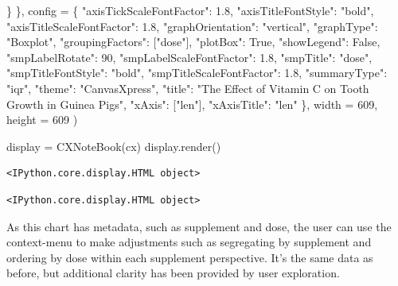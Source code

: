 \documentclass[
  letterpaper,
  DIV=11,
  numbers=noendperiod]{scrartcl}
\newenvironment{Shaded}{\begin{snugshade}}{\end{snugshade}}
\newcommand{\DecValTok}[1]{\textcolor[rgb]{0.68,0.00,0.00}{#1}}
\newcommand{\FloatTok}[1]{\textcolor[rgb]{0.68,0.00,0.00}{#1}}
\newcommand{\NormalTok}[1]{\textcolor[rgb]{0.00,0.23,0.31}{#1}}
\newcommand{\OperatorTok}[1]{\textcolor[rgb]{0.37,0.37,0.37}{#1}}
\newcommand{\StringTok}[1]{\textcolor[rgb]{0.13,0.47,0.30}{#1}}
\newcommand{\VariableTok}[1]{\textcolor[rgb]{0.07,0.07,0.07}{#1}}
\begin{document}
\begin{Shaded}
\begin{Highlighting}[]
\NormalTok{     \}}
\NormalTok{   \},}
\NormalTok{   config }\OperatorTok{=}\NormalTok{ \{}
     \StringTok{"axisTickScaleFontFactor"}\NormalTok{: }\FloatTok{1.8}\NormalTok{,}
     \StringTok{"axisTitleFontStyle"}\NormalTok{: }\StringTok{"bold"}\NormalTok{,}
     \StringTok{"axisTitleScaleFontFactor"}\NormalTok{: }\FloatTok{1.8}\NormalTok{,}
     \StringTok{"graphOrientation"}\NormalTok{: }\StringTok{"vertical"}\NormalTok{,}
     \StringTok{"graphType"}\NormalTok{: }\StringTok{"Boxplot"}\NormalTok{,}
     \StringTok{"groupingFactors"}\NormalTok{: [}\StringTok{"dose"}\NormalTok{],}
     \StringTok{"plotBox"}\NormalTok{: }\VariableTok{True}\NormalTok{,}
     \StringTok{"showLegend"}\NormalTok{: }\VariableTok{False}\NormalTok{,}
     \StringTok{"smpLabelRotate"}\NormalTok{: }\DecValTok{90}\NormalTok{,}
     \StringTok{"smpLabelScaleFontFactor"}\NormalTok{: }\FloatTok{1.8}\NormalTok{,}
     \StringTok{"smpTitle"}\NormalTok{: }\StringTok{"dose"}\NormalTok{,}
     \StringTok{"smpTitleFontStyle"}\NormalTok{: }\StringTok{"bold"}\NormalTok{,}
     \StringTok{"smpTitleScaleFontFactor"}\NormalTok{: }\FloatTok{1.8}\NormalTok{,}
     \StringTok{"summaryType"}\NormalTok{: }\StringTok{"iqr"}\NormalTok{,}
     \StringTok{"theme"}\NormalTok{: }\StringTok{"CanvasXpress"}\NormalTok{,}
     \StringTok{"title"}\NormalTok{: }\StringTok{"The Effect of Vitamin C on Tooth Growth in Guinea Pigs"}\NormalTok{,}
     \StringTok{"xAxis"}\NormalTok{: [}\StringTok{"len"}\NormalTok{],}
     \StringTok{"xAxisTitle"}\NormalTok{: }\StringTok{"len"}
\NormalTok{   \},}
\NormalTok{   width }\OperatorTok{=} \DecValTok{609}\NormalTok{,}
\NormalTok{   height }\OperatorTok{=} \DecValTok{609}
\NormalTok{ )}
 
\NormalTok{ display }\OperatorTok{=}\NormalTok{ CXNoteBook(cx)}
\NormalTok{ display.render()}
\end{Highlighting}
\end{Shaded}

\begin{verbatim}
<IPython.core.display.HTML object>
\end{verbatim}

\begin{verbatim}
<IPython.core.display.HTML object>
\end{verbatim}

As this chart has metadata, such as supplement and dose, the user can
use the context-menu to make adjustments such as segregating by
supplement and ordering by dose within each supplement perspective. It's
the same data as before, but additional clarity has been provided by
user exploration.
\end{document}
